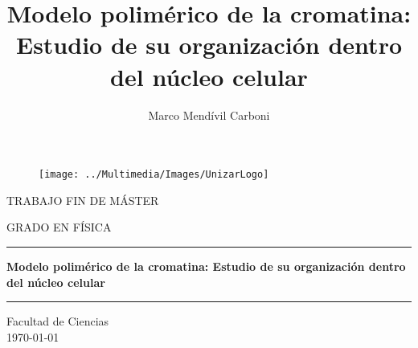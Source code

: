 \documentclass[a4paper,11pt]{article}
\title{Modelo polimérico de la cromatina: Estudio de su organización dentro del núcleo celular}
\author{Marco Mendívil Carboni}
\begin{document}
\renewcommand{\contentsname}{Índice}
\renewcommand{\tablename}{Tabla}
\renewcommand{\appendixname}{Anexo}


\begin{titlepage}

\vspace*{4mm}

\begin{figure}[h]
  \centering
  \texttt{[image: ../Multimedia/Images/UnizarLogo]}
\end{figure}

\vspace*{8mm}

\begin{center}
\Large TRABAJO FIN DE MÁSTER
\end{center}
\begin{center}
\Large GRADO EN FÍSICA
\end{center}

\vspace*{8mm}

\hrule

\vspace*{4mm}

\begin{center}
\huge\bf Modelo polimérico de la cromatina: Estudio de su organización dentro del núcleo celular
\end{center}

\vspace*{4mm}

\hrule

\vspace*{20mm}


\vspace*{8mm}


\vfill

\begin{center}
\large Facultad de Ciencias\\
\today\\
\end{center}

\end{titlepage}

\clearpage
\thispagestyle{empty}\hfill
\clearpage

\end{document}
